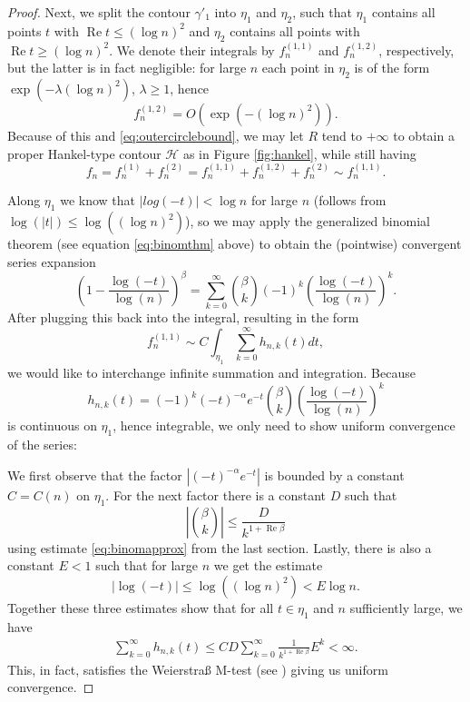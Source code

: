 \begin{proof}
Next, we split the contour $\gamma'_1$ into $\eta_1$ and $\eta_2$, such that $\eta_1$ contains all points $t$ with $\operatorname{Re} t \leq (\log n)^2$ and $\eta_2$ contains all points with $\operatorname{Re} t \geq (\log n)^2$. 
We denote their integrals by $f_n^{(1, 1)}$ and $f_n^{(1, 2)}$, respectively, but the latter is in fact negligible: for large $n$ each point in $\eta_2$ is of the form $\exp(-\lambda (\log n)^2)$, $\lambda \geq 1$, hence
\begin{equation*}
    f_n^{(1, 2)} = O(\exp(-(\log n)^2)).
\end{equation*}
Because of this and \eqref{eq:outercirclebound}, we may let $R$ tend to $+\infty$ to obtain a proper Hankel-type contour $\mathcal{H}$ as in Figure \ref{fig:hankel}, while still having
\begin{equation*}
    f_n = f_n^{(1)} + f_n^{(2)} = f_n^{(1,1)} + f_n^{(1,2)} + f_n^{(2)} \sim f_n^{(1,1)}.
\end{equation*}

Along $\eta_1$ we know that $|log(-t)| < \log n$ for large $n$ (follows from $\log(|t|) \leq \log((\log n)^2)$), so we may apply the generalized binomial theorem (see equation \eqref{eq:binomthm} above) to obtain the (pointwise) convergent series expansion
\begin{equation*}
    \left(1 - \frac{\log(-t)}{\log(n)} \right)^\beta = \sum_{k=0}^\infty \binom{\beta}{k} (-1)^k \left( \frac{\log(-t)}{\log(n)} \right) ^k.
\end{equation*}
After plugging this back into the integral, resulting in the form
\begin{equation*}
    f_n^{(1, 1)} \sim C \int_{\eta_1} \sum_{k=0}^\infty h_{n, k}(t) dt, 
\end{equation*}
we would like to interchange infinite summation and integration. 
Because
\begin{equation*}
    h_{n, k}(t) = (-1)^k (-t)^{-\alpha} e^{-t} \binom{\beta}{k} \left( \frac{\log(-t)}{\log(n)} \right) ^k
\end{equation*}
is continuous on $\eta_1$, hence integrable, we only need to show uniform convergence of the series:

We first observe that the factor $|(-t)^{-\alpha} e^{-t}|$ is bounded by a constant $C = C(n)$ on $\eta_1$.
For the next factor there is a constant $D$ such that
\begin{equation*}
    \left| \binom{\beta}{k} \right| \leq \frac{D}{k^{1+\operatorname{Re} \beta}} 
\end{equation*}
using estimate \eqref{eq:binomapprox} from the last section. Lastly, there is also a constant $E < 1$ such that for large $n$ we get the estimate
\begin{equation*}
    |\log(-t)| \leq \log( (\log n)^2 ) < E \log n.
\end{equation*}
Together these three estimates show that for all $t \in \eta_1$ and $n$ sufficiently large, we have
\begin{align*}
    \sum_{k=0}^\infty h_{n, k}(t) \leq C D \sum_{k=0}^\infty \frac{1}{k^{1+\operatorname{Re} \beta}} E^k < \infty.
\end{align*}
This, in fact, satisfies the Weierstraß M-test (see \cite{wmtest}) giving us uniform convergence.


\end{proof}
